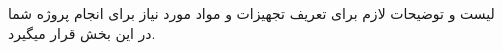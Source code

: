 لیست و توضیحات لازم برای تعریف تجهیزات و مواد مورد نیاز برای انجام پروژه شما در این بخش قرار میگیرد.